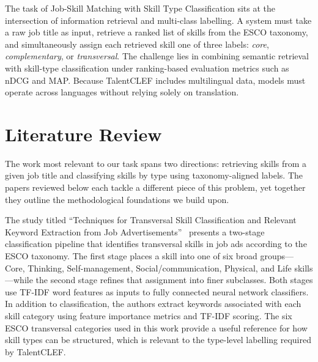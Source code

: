 \documentclass[]{ceurart}
\begin{document}
The task of Job-Skill Matching with Skill Type Classification sits at the intersection of
information retrieval and multi-class labelling. A system must take a raw job title as
input, retrieve a ranked list of skills from the ESCO taxonomy, and simultaneously assign
each retrieved skill one of three labels: \textit{core}, \textit{complementary}, or
\textit{transversal}. The challenge lies in combining semantic retrieval with
skill-type classification under ranking-based evaluation metrics such as nDCG and MAP.
Because TalentCLEF includes multilingual data, models must operate across languages
without relying solely on translation. 

\section{Literature Review}

The work most relevant to our task spans two directions: retrieving skills from a given job
title and classifying skills by type using taxonomy-aligned labels. The papers
reviewed below each tackle a different piece of this problem, yet together they outline
the methodological foundations we build upon.

The study titled ``Techniques for Transversal Skill Classification and Relevant Keyword
Extraction from Job Advertisements''~\cite{Gavrilescu2025}
presents a two-stage classification pipeline that identifies transversal skills in job
ads according to the ESCO taxonomy. The first stage places a skill into one of six
broad groups---Core, Thinking, Self-management, Social/communication, Physical, and
Life skills---while the second stage refines that assignment into finer subclasses.
Both stages use TF-IDF word features as inputs to fully connected neural network
classifiers. In addition to classification, the authors extract keywords associated
with each skill category using feature importance metrics and TF-IDF scoring. The
six ESCO transversal categories used in this work provide a useful reference for how
skill types can be structured, which is relevant to the type-level labelling required
by TalentCLEF.

\end{document}
